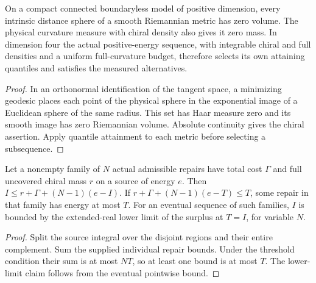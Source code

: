 \begin{lemma}
\label{lem:ed03-distance-spheres}
\leanok
On a compact connected boundaryless model of positive dimension, every
intrinsic distance sphere of a smooth Riemannian metric has zero volume.
The physical curvature measure with chiral density also gives it zero mass.
In dimension four the actual positive-energy sequence, with integrable
chiral and full densities and a uniform full-curvature budget, therefore
selects its own attaining quantiles and satisfies the measured alternatives.
\end{lemma}
\begin{proof}
\leanok
In an orthonormal identification of the tangent space, a minimizing
geodesic places each point of the physical sphere in the exponential
image of a Euclidean sphere of the same radius. This set has Haar
measure zero and its smooth image has zero Riemannian volume. Absolute
continuity gives the chiral assertion. Apply quantile attainment to
each metric before selecting a subsequence.
\end{proof}

\begin{lemma}
\label{lem:ed03-repair-threshold}
\leanok
Let a nonempty family of \(N\) actual admissible repairs have total cost
\(\Gamma\) and full uncovered chiral mass \(r\) on a source of energy \(e\).
Then \(I\le r+\Gamma+(N-1)(e-I)\). If
\(r+\Gamma+(N-1)(e-T)\le T\), some repair in that family has energy at most
\(T\). For an eventual sequence of such families, \(I\) is bounded by the
extended-real lower limit of the surplus at \(T=I\), for variable \(N\).
\end{lemma}
\begin{proof}
\leanok
Split the source integral over the disjoint regions and their entire
complement. Sum the supplied individual repair bounds. Under the threshold
condition their sum is at most \(NT\), so at least one bound is at most \(T\).
The lower-limit claim follows from the eventual pointwise bound.
\end{proof}

